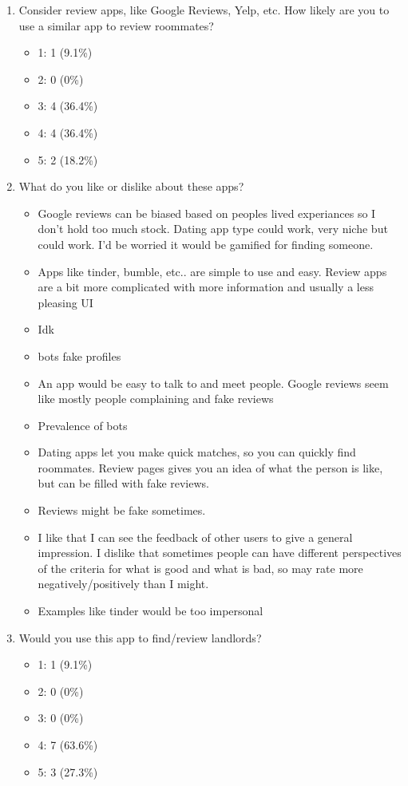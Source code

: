 \documentclass{article}
\begin{document}
\begin{appendices}
\begin{enumerate}
    \medskip
    \item{Consider review apps, like Google Reviews, Yelp, etc. How likely are you to use a similar app 
    to review roommates?}
    \begin{itemize}
        \item 1: 1 (9.1\%)
        \item 2: 0 (0\%)
        \item 3: 4 (36.4\%)
        \item 4: 4 (36.4\%)
        \item 5: 2 (18.2\%)
    \end{itemize}
    
    \medskip
    \item{What do you like or dislike about these apps?}
    \begin{itemize}
        \item Google reviews can be biased based on peoples lived experiances so I don't hold too much 
        stock. Dating app type could work, very niche but could work. I'd be worried it would be 
        gamified for finding someone.
        \item Apps like tinder, bumble, etc.. are simple to use and easy. Review apps are a bit more 
        complicated with more information and usually a less pleasing UI
        \item Idk
        \item bots fake profiles
        \item An app would be easy to talk to and meet people. Google reviews seem like mostly people 
        complaining and fake reviews
        \item Prevalence of bots
        \item Dating apps let you make quick matches, so you can quickly find roommates. Review pages 
        gives you an idea of what the person is like, but can be filled with fake reviews.
        \item Reviews might be fake sometimes. 
        \item I like that I can see the feedback of other users to give a general impression. I dislike 
        that sometimes people can have different perspectives of the criteria for what is good and what 
        is bad, so may rate more negatively/positively than I might.
        \item Examples like tinder would be too impersonal
    \end{itemize}
    
    \medskip
    \item{Would you use this app to find/review landlords?}
    \begin{itemize}
        \item 1: 1 (9.1\%)
        \item 2: 0 (0\%)
        \item 3: 0 (0\%)
        \item 4: 7 (63.6\%)
        \item 5: 3 (27.3\%)
    \end{itemize}
    

\end{enumerate}
\end{appendices}
\end{document}
